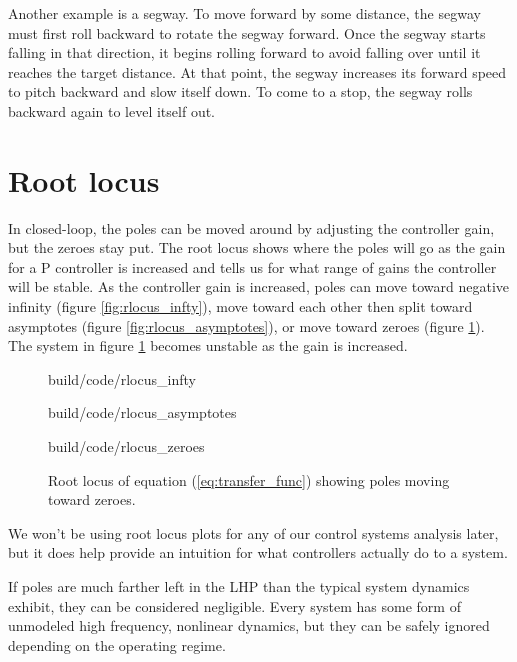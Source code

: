 Another example is a segway. To move forward by some distance, the segway must
first roll backward to rotate the segway forward. Once the segway starts falling
in that direction, it begins rolling forward to avoid falling over until
it reaches the target distance. At that point, the segway increases its forward
speed to pitch backward and slow itself down. To come to a stop, the segway
rolls backward again to level itself out.

\section{Root locus} \label{sec:root_locus}

In closed-loop, the poles can be moved around by adjusting the controller gain,
but the zeroes stay put. The root locus shows where the poles will go as the
gain for a P controller is increased and tells us for what range of gains the
controller will be stable. As the controller gain is increased, poles can move
toward negative infinity (figure \ref{fig:rlocus_infty}), move toward each other
then split toward asymptotes (figure \ref{fig:rlocus_asymptotes}), or move
toward zeroes (figure \ref{fig:rlocus_zeroes}). The \gls{system} in figure
\ref{fig:rlocus_zeroes} becomes unstable as the gain is increased.

\begin{figure}
  \begin{minisvg}{build/code/rlocus_infty}
    \caption{Root locus showing pole moving toward negative infinity}
    \label{fig:rlocus_infty}
  \end{minisvg}
  \hfill
  \begin{minisvg}{build/code/rlocus_asymptotes}
    \caption{Root locus showing poles moving toward asymptotes}
    \label{fig:rlocus_asymptotes}
  \end{minisvg}
  \begin{minisvg}{build/code/rlocus_zeroes}
    \caption{Root locus of equation (\ref{eq:transfer_func}) showing poles
      moving toward zeroes.}
    \label{fig:rlocus_zeroes}
  \end{minisvg}
\end{figure}

We won't be using root locus plots for any of our control systems analysis
later, but it does help provide an intuition for what controllers actually do to
a system.

If poles are much farther left in the LHP than the typical \gls{system} dynamics
exhibit, they can be considered negligible. Every \gls{system} has some form of
unmodeled high frequency, nonlinear dynamics, but they can be safely ignored
depending on the operating regime.

